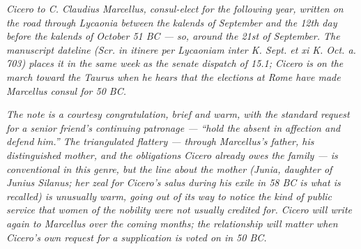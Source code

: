 
\textit{Cicero to C. Claudius Marcellus, consul-elect
for the following year, written on the road through
Lycaonia between the kalends of September and the
12th day before the kalends of October 51 BC --- so,
around the 21st of September. The manuscript dateline
(\textit{Scr. in itinere per Lycaoniam inter K. Sept.
et xi K. Oct. a. 703}) places it in the same week as
the senate dispatch of 15.1; Cicero is on the march
toward the Taurus when he hears that the elections at
Rome have made Marcellus consul for 50 BC.}

\textit{The note is a courtesy congratulation, brief
and warm, with the standard request for a senior
friend's continuing patronage --- ``hold the absent in
affection and defend him.'' The triangulated
flattery --- through Marcellus's father, his
distinguished mother, and the obligations Cicero
already owes the family --- is conventional in this
genre, but the line about the mother (Junia, daughter
of Junius Silanus; her zeal for Cicero's
\textit{salus} during his exile in 58 BC is what is
recalled) is unusually warm, going out of its way to
notice the kind of public service that women of the
nobility were not usually credited for. Cicero will
write again to Marcellus over the coming months; the
relationship will matter when Cicero's own request for
a supplication is voted on in 50 BC.}
